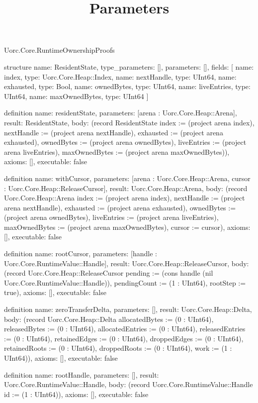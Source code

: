 \begin{lexlean}{Uorc.Core.RuntimeOwnershipProofs}
\title{Parameters}
\begin{semanticmodule}
structure{
  name: ResidentState,
  type_parameters: [],
  parameters: [],
  fields: [
    {name: index, type: Uorc.Core.Heap::Index},
    {name: nextHandle, type: UInt64},
    {name: exhausted, type: Bool},
    {name: ownedBytes, type: UInt64},
    {name: liveEntries, type: UInt64},
    {name: maxOwnedBytes, type: UInt64}
  ]
}

definition{
  name: residentState,
  parameters: [arena : Uorc.Core.Heap::Arena],
  result: ResidentState,
  body: (record ResidentState {index := (project arena index), nextHandle := (project arena nextHandle), exhausted := (project arena exhausted), ownedBytes := (project arena ownedBytes), liveEntries := (project arena liveEntries), maxOwnedBytes := (project arena maxOwnedBytes)}),
  axioms: [],
  executable: false
}

definition{
  name: withCursor,
  parameters: [arena : Uorc.Core.Heap::Arena, cursor : Uorc.Core.Heap::ReleaseCursor],
  result: Uorc.Core.Heap::Arena,
  body: (record Uorc.Core.Heap::Arena {index := (project arena index), nextHandle := (project arena nextHandle), exhausted := (project arena exhausted), ownedBytes := (project arena ownedBytes), liveEntries := (project arena liveEntries), maxOwnedBytes := (project arena maxOwnedBytes), cursor := cursor}),
  axioms: [],
  executable: false
}

definition{
  name: rootCursor,
  parameters: [handle : Uorc.Core.RuntimeValue::Handle],
  result: Uorc.Core.Heap::ReleaseCursor,
  body: (record Uorc.Core.Heap::ReleaseCursor {pending := (cons handle (nil Uorc.Core.RuntimeValue::Handle)), pendingCount := (1 : UInt64), rootStep := true}),
  axioms: [],
  executable: false
}

definition{
  name: zeroTransferDelta,
  parameters: [],
  result: Uorc.Core.Heap::Delta,
  body: (record Uorc.Core.Heap::Delta {allocatedBytes := (0 : UInt64), releasedBytes := (0 : UInt64), allocatedEntries := (0 : UInt64), releasedEntries := (0 : UInt64), retainedEdges := (0 : UInt64), droppedEdges := (0 : UInt64), retainedRoots := (0 : UInt64), droppedRoots := (0 : UInt64), work := (1 : UInt64)}),
  axioms: [],
  executable: false
}

definition{
  name: rootHandle,
  parameters: [],
  result: Uorc.Core.RuntimeValue::Handle,
  body: (record Uorc.Core.RuntimeValue::Handle {id := (1 : UInt64)}),
  axioms: [],
  executable: false
}


\end{semanticmodule}
\end{lexlean}
